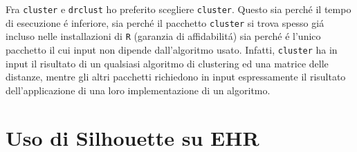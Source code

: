 \documentclass[italian]{article}
\begin{document}
			Fra \texttt{cluster} e \texttt{drclust} ho preferito scegliere
			\texttt{cluster}. Questo sia perché il tempo di esecuzione é
			inferiore, sia perché il pacchetto \texttt{cluster} si trova
			spesso giá incluso nelle installazioni di \texttt{R} (garanzia
			di affidabilitá) sia perché é l'unico pacchetto il cui input
			non dipende dall'algoritmo usato. Infatti, \texttt{cluster}
			ha in input il risultato di un qualsiasi algoritmo di clustering
			ed una matrice delle distanze, mentre gli altri pacchetti
			richiedono in input espressamente il risultato dell'applicazione
			di una loro implementazione di un algoritmo.

	\section{Uso di Silhouette su EHR}
\end{document}
